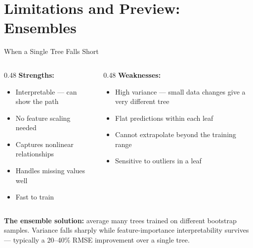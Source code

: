 \documentclass[aspectratio=169, 11pt]{beamer}
\begin{document}
\section{Limitations and Preview: Ensembles}


\begin{frame}{When a Single Tree Falls Short}
  \begin{columns}[T]
    \begin{column}{0.48\textwidth}
      \textbf{Strengths:}
      {
      \begin{itemize}\small
        \item Interpretable --- can show the path
        \item No feature scaling needed
        \item Captures nonlinear relationships
        \item Handles missing values well
        \item Fast to train
      \end{itemize}}
    \end{column}
    \begin{column}{0.48\textwidth}
      \textbf{Weaknesses:}
      {
      \begin{itemize}\small
        \item High variance --- small data changes give a very different tree
        \item Flat predictions within each leaf
        \item Cannot extrapolate beyond the training range
        \item Sensitive to outliers in a leaf
      \end{itemize}}
    \end{column}
  \end{columns}
  \vspace{0.2cm}
  \textbf{The ensemble solution:} average many trees trained on different
  bootstrap samples. Variance falls sharply while feature-importance
  interpretability survives --- typically a 20--40\% RMSE improvement over a
  single tree.
\end{frame}
\end{document}
